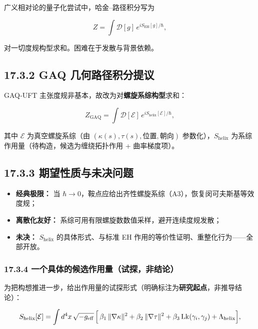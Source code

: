 广义相对论的量子化尝试中，哈金--路径积分写为

\[
Z=\int \mathcal{D}[g]\,e^{i S_{\mathrm{EH}}[g]/\hbar},
\]

对一切度规构型求和。困难在于发散与背景依赖。

\subsection{17.3.2 GAQ
几何路径积分提议}\label{gaq-ux51e0ux4f55ux8defux5f84ux79efux5206ux63d0ux8bae}

GAQ‑UFT 主张度规非基本，故改为对\textbf{螺旋系综构型}求和：

\[
Z_{\mathrm{GAQ}}=\int \mathcal{D}[\mathcal{E}]\,e^{i S_{\mathrm{helix}}[\mathcal{E}]/\hbar},
\]

其中 \(\mathcal{E}\) 为真空螺旋系综（由
\((\kappa(s),\tau(s),\text{位置},\text{朝向})\)
参数化），\(S_{\mathrm{helix}}\)
为系综作用量（待构造，候选为缠绕拓扑作用 + 曲率梯度项）。

\subsection{17.3.3
期望性质与未决问题}\label{ux671fux671bux6027ux8d28ux4e0eux672aux51b3ux95eeux9898}

\begin{itemize}
\tightlist
\item
  \textbf{经典极限：} 当
  \(\hbar\to0\)，鞍点应给出齐性螺旋系综（A3），恢复闵可夫斯基等效度规；
\item
  \textbf{离散化友好：} 系综可用有限螺旋数数值采样，避开连续度规发散；
\item
  \textbf{未决：} \(S_{\mathrm{helix}}\) 的具体形式、与标准 EH
  作用的等价性证明、重整化行为------全部开放。
\end{itemize}

\subsubsection{17.3.4
一个具体的候选作用量（试探，非结论）}\label{ux4e00ux4e2aux5177ux4f53ux7684ux5019ux9009ux4f5cux7528ux91cfux8bd5ux63a2ux975eux7ed3ux8bba}

为把构想推进一步，给出作用量的试探形式（明确标注为\textbf{研究起点}，非推导结论）：

\[
S_{\mathrm{helix}}[\mathcal{E}]
= \int d^4x\,\sqrt{-g_{\mathrm{eff}}}\,
\Bigl[\,\beta_1\,\|\nabla\kappa\|^2+\beta_2\,\|\nabla\tau\|^2
+\beta_3\,\mathrm{Lk}(\gamma_i,\gamma_j)
+\Lambda_{\mathrm{helix}}\Bigr],
\]

